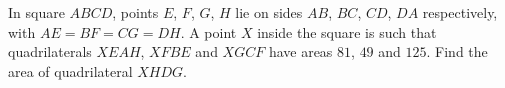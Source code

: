 In square $ABCD$, points $E$, $F$, $G$, $H$ lie on sides $AB$, $BC$, $CD$, $DA$ respectively, with $AE=BF=CG=DH$. A point $X$ inside the square is such that quadrilaterals $XEAH$, $XFBE$ and $XGCF$ have areas $81$, $49$ and $125$. Find the area of quadrilateral $XHDG$.
